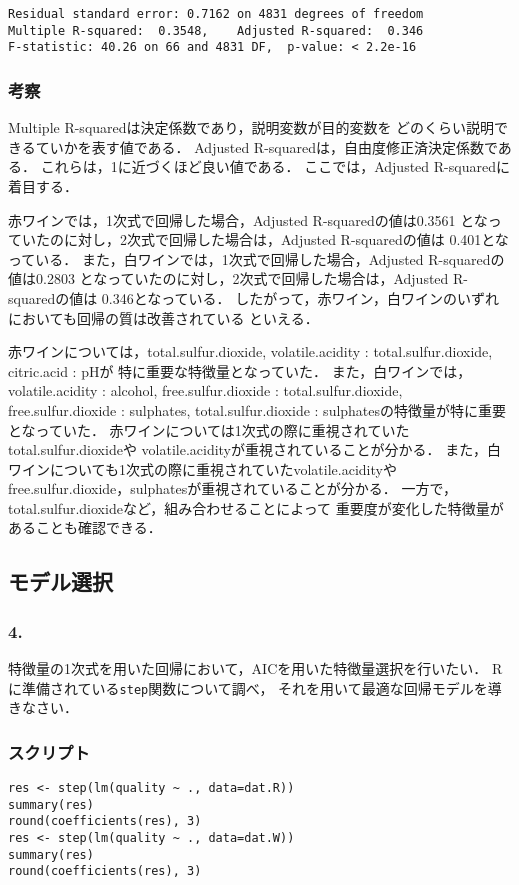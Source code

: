 \documentclass{jsarticle}
\begin{document}
\begin{verbatim}
Residual standard error: 0.7162 on 4831 degrees of freedom
Multiple R-squared:  0.3548,    Adjusted R-squared:  0.346 
F-statistic: 40.26 on 66 and 4831 DF,  p-value: < 2.2e-16
\end{verbatim}

\subsubsection*{考察}
Multiple R-squaredは決定係数であり，説明変数が目的変数を
どのくらい説明できるていかを表す値である．
Adjusted R-squaredは，自由度修正済決定係数である．
これらは，1に近づくほど良い値である．
ここでは，Adjusted R-squaredに着目する．

赤ワインでは，1次式で回帰した場合，Adjusted R-squaredの値は0.3561
となっていたのに対し，2次式で回帰した場合は，Adjusted R-squaredの値は
0.401となっている．
また，白ワインでは，1次式で回帰した場合，Adjusted R-squaredの値は0.2803
となっていたのに対し，2次式で回帰した場合は，Adjusted R-squaredの値は
0.346となっている．
したがって，赤ワイン，白ワインのいずれにおいても回帰の質は改善されている
といえる．

赤ワインについては，total.sulfur.dioxide,
volatile.acidity : total.sulfur.dioxide, citric.acid : pHが
特に重要な特徴量となっていた．
また，白ワインでは，
volatile.acidity : alcohol,
free.sulfur.dioxide : total.sulfur.dioxide,
free.sulfur.dioxide : sulphates,
total.sulfur.dioxide : sulphatesの特徴量が特に重要となっていた．
赤ワインについては1次式の際に重視されていたtotal.sulfur.dioxideや
volatile.acidityが重視されていることが分かる．
また，白ワインについても1次式の際に重視されていたvolatile.acidityや
free.sulfur.dioxide，sulphatesが重視されていることが分かる．
一方で，total.sulfur.dioxideなど，組み合わせることによって
重要度が変化した特徴量があることも確認できる．

\subsection*{モデル選択}
\subsubsection*{4.}
特徴量の1次式を用いた回帰において，AICを用いた特徴量選択を行いたい．
Rに準備されている\verb|step|関数について調べ，
それを用いて最適な回帰モデルを導きなさい．

\subsubsection*{スクリプト}
\begin{lstlisting}[basicstyle=\ttfamily\footnotesize, frame=single]
res <- step(lm(quality ~ ., data=dat.R))
summary(res)
round(coefficients(res), 3)
res <- step(lm(quality ~ ., data=dat.W))
summary(res)
round(coefficients(res), 3)
\end{lstlisting}
\end{document}
